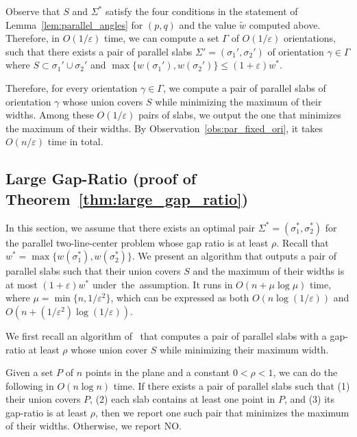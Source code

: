 \documentclass[english,a4paper, cleveref, autoref, thm-restate, nolineno]{socg-lipics-v2021}
\theoremstyle{star}
\theoremstyle{claimstar}
\newcommand{\eps}{\ensuremath{\varepsilon}}
\begin{document}
Observe that $S$ and $\Sigma^*$ satisfy the four conditions in the statement of Lemma~\ref{lem:parallel_angles} for $(p, q)$ and the value $\widetilde w$ computed above.
Therefore, in $O(1/\eps)$ time, we can compute a set $\Gamma$ of $O(1/\eps)$ orientations, such that there exists a pair of parallel slabs $\Sigma' = (\sigma_1', \sigma_2')$  of orientation $\gamma \in \Gamma$ where $S\subset \sigma_1'\cup \sigma_2'$ and $\max \{w(\sigma_1'), w(\sigma_2') \} \le (1+\eps) w^*$.

Therefore, for every orientation $\gamma \in \Gamma$, we compute a pair of parallel slabs of orientation $\gamma$ whose union covers $S$ while minimizing the maximum of their widths. 
Among these $O(1/\eps)$ pairs of slabs, we output the one that minimizes the maximum of their widths.
By Observation~\ref{obs:par_fixed_ori}, it takes $O(n/\eps)$ time in total. 



\subsection{Large Gap-Ratio (proof of Theorem~\ref{thm:large_gap_ratio})}
\label{sec:large_gap_ratio}
In this section, we assume that there exists an optimal pair $\Sigma^* = (\sigma_1^*, \sigma_2^*)$ for the parallel two-line-center problem whose gap ratio is at least $\rho$. 
Recall that $w^* = \max \{w(\sigma_1^*), w(\sigma_2^*) \}$.
We present an algorithm that outputs a pair of parallel slabs such that their union covers $S$ and the maximum of their widths is at most $(1+\eps)w^*$ under~the~assumption. 
It runs in $O(n + \mu \log \mu)$ time, where $\mu = \min \{n, 1/\eps^2 \}$, which can be expressed as both $O(n \log (1/\eps))$ and $O(n + (1/\eps^2) \log (1/\eps))$. 

We first recall an algorithm of~\cite{chung2025parallel} that computes a pair of parallel slabs with a gap-ratio at least $\rho$ whose union cover $S$ while minimizing their maximum width.


\begin{theorem}
    \label{thm:large_gap_prev}
    Given a set $P$ of $n$ points in the plane and a constant $0< \rho < 1$, we can do the following in $O(n\log n)$ time. If there exists a pair of parallel slabs such that (1) their union covers $P$, (2) each slab contains at least one point in $P$, and (3) its gap-ratio is at least $\rho$, then we report one such pair that minimizes the maximum of their widths.
    Otherwise, we report NO.
\end{theorem}
\end{document}
